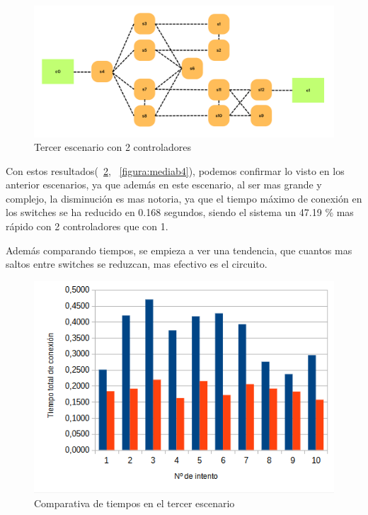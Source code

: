 \documentclass[a4paper, 12pt]{book}
\begin{document}
 	\begin{figure}[H]
 		\centering
 		\includegraphics[width=14cm, keepaspectratio]{img/b4_2}
 		\caption{Tercer escenario con 2 controladores}
 		\label{figura:b4_2}
 	\end{figure}
 	
 	Con estos resultados(~\ref{figura:comparativab4}, ~\ref{figura:mediab4}), podemos confirmar lo visto en los anterior escenarios, ya que además en este escenario, al ser mas grande y complejo, la disminución es mas notoria, ya que el tiempo máximo de conexión en los switches se ha reducido en 0.168 segundos, siendo el sistema un 47.19 \% mas rápido con 2 controladores que con 1.
 	
 	Además comparando tiempos, se empieza a ver una tendencia, que cuantos mas saltos entre switches se reduzcan, mas efectivo es el circuito.
 	
 	\begin{figure}[H]
 		\centering
 		\includegraphics[width=12cm, keepaspectratio]{img/comparativaescenario3}
 		\caption{Comparativa de tiempos en el tercer escenario}
 		\label{figura:comparativab4}
 	\end{figure}
 	
\end{document}
